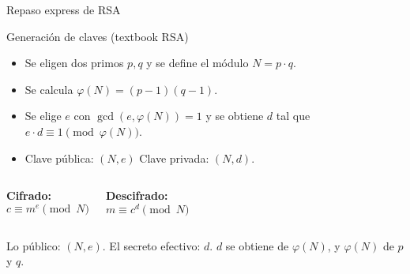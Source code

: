 \documentclass[aspectratio=169]{beamer}
\begin{document}
\begin{frame}{Repaso express de RSA}
  \begin{block}{Generación de claves (textbook RSA)}
    \begin{itemize}
      \item Se eligen dos primos $p,q$ y se define el módulo $N = p\cdot q$.
      \item Se calcula $\varphi(N)=(p-1)(q-1)$.
      \item Se elige $e$ con $\gcd(e,\varphi(N))=1$ y se obtiene
            $d$ tal que $e\cdot d\equiv 1\pmod{\varphi(N)}$.
      \item Clave pública: $(N,e)$ \quad Clave privada: $(N,d)$.
    \end{itemize}
  \end{block}

  \begin{columns}[T]
    \textbf{Cifrado:}
    \[ c \equiv m^e \pmod{N} \]

    \textbf{Descifrado:}
    \[ m \equiv c^d \pmod{N} \]
  \end{columns}

  \vspace{0.4em}
  Lo público: $(N,e)$. \quad El secreto efectivo: $d$.
  \quad $d$ se obtiene de $\varphi(N)$, y $\varphi(N)$ de $p$ y $q$.

\end{frame}
\end{document}
